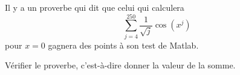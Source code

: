 \begin{exercice}\label{exotestMAT1151-G310001}

	Il y a un proverbe qui dit que celui qui calculera 
	\begin{equation}
		\sum_{j=4}^{250}\frac{1}{ \sqrt{j} }\cos(x^j)
	\end{equation}
	pour $x=0$ gagnera des points à son test de Matlab. 

	Vérifier le proverbe, c'est-à-dire donner la valeur de la somme.

\end{exercice}
